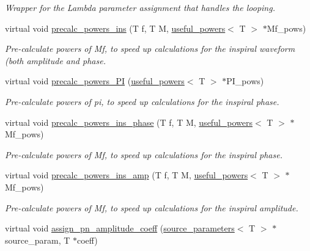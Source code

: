 \begin{DoxyCompactItemize}
\begin{DoxyCompactList}\small\item\em Wrapper for the Lambda parameter assignment that handles the looping. \end{DoxyCompactList}\item 
virtual void \hyperlink{classIMRPhenomD_ade98ea0729f58a3216ecec948dec9e4a}{precalc\+\_\+powers\+\_\+ins} (T f, T M, \hyperlink{structuseful__powers}{useful\+\_\+powers}$<$ T $>$ $\ast$Mf\+\_\+pows)
\begin{DoxyCompactList}\small\item\em Pre-\/calculate powers of Mf, to speed up calculations for the inspiral waveform (both amplitude and phase. \end{DoxyCompactList}\item 
virtual void \hyperlink{classIMRPhenomD_a1181334310432c4d69ede3a3b2b0fcdb}{precalc\+\_\+powers\+\_\+\+PI} (\hyperlink{structuseful__powers}{useful\+\_\+powers}$<$ T $>$ $\ast$P\+I\+\_\+pows)
\begin{DoxyCompactList}\small\item\em Pre-\/calculate powers of pi, to speed up calculations for the inspiral phase. \end{DoxyCompactList}\item 
virtual void \hyperlink{classIMRPhenomD_aa4647f539a66554bcc5066861328cf06}{precalc\+\_\+powers\+\_\+ins\+\_\+phase} (T f, T M, \hyperlink{structuseful__powers}{useful\+\_\+powers}$<$ T $>$ $\ast$Mf\+\_\+pows)
\begin{DoxyCompactList}\small\item\em Pre-\/calculate powers of Mf, to speed up calculations for the inspiral phase. \end{DoxyCompactList}\item 
virtual void \hyperlink{classIMRPhenomD_ac25dfdbacff0e696d752db44dd0a6c6b}{precalc\+\_\+powers\+\_\+ins\+\_\+amp} (T f, T M, \hyperlink{structuseful__powers}{useful\+\_\+powers}$<$ T $>$ $\ast$Mf\+\_\+pows)
\begin{DoxyCompactList}\small\item\em Pre-\/calculate powers of Mf, to speed up calculations for the inspiral amplitude. \end{DoxyCompactList}\item 
\mbox{\label{classIMRPhenomD_a48e215265b20ae41245713b3900306dc}} 
virtual void \hyperlink{classIMRPhenomD_a48e215265b20ae41245713b3900306dc}{assign\+\_\+pn\+\_\+amplitude\+\_\+coeff} (\hyperlink{structsource__parameters}{source\+\_\+parameters}$<$ T $>$ $\ast$source\+\_\+param, T $\ast$coeff)

\end{DoxyCompactItemize}
